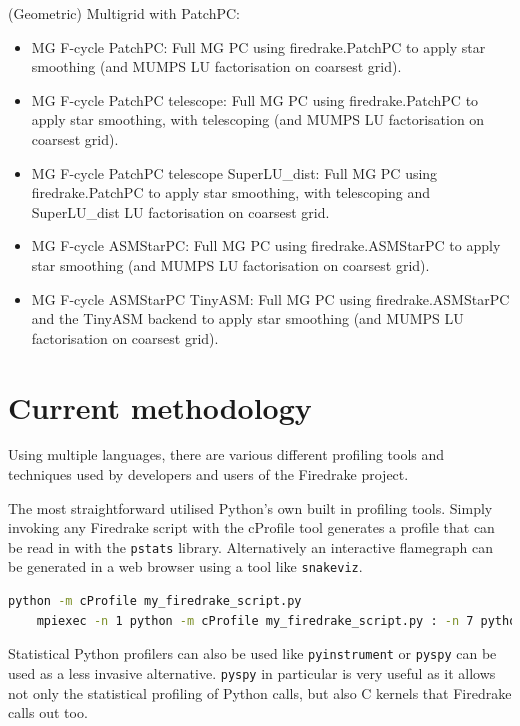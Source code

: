 \documentclass[a4paper,11pt]{article}
\begin{document}
\noindent(Geometric) Multigrid with PatchPC:
\begin{itemize}
	\item MG F-cycle PatchPC: Full MG PC using firedrake.PatchPC to apply star smoothing (and MUMPS LU factorisation on coarsest grid).
    \item MG F-cycle PatchPC telescope: Full MG PC using firedrake.PatchPC to apply star smoothing, with telescoping (and MUMPS LU factorisation on coarsest grid).
    \item MG F-cycle PatchPC telescope SuperLU\_dist: Full MG PC using firedrake.PatchPC to apply star smoothing, with telescoping and SuperLU\_dist LU factorisation on coarsest grid.
    \item MG F-cycle ASMStarPC: Full MG PC using firedrake.ASMStarPC to apply star smoothing (and MUMPS LU factorisation on coarsest grid).
    \item MG F-cycle ASMStarPC TinyASM: Full MG PC using firedrake.ASMStarPC and the TinyASM backend to apply star smoothing (and MUMPS LU factorisation on coarsest grid).
\end{itemize}
    


\section{Current methodology}
\label{sec:current}
Using multiple languages, there are various different profiling tools and techniques used by developers and users of the Firedrake project.

The most straightforward utilised Python's own built in profiling tools.
Simply invoking any Firedrake script with the cProfile tool generates a profile that can be read in with the \verb`pstats` library.
Alternatively an interactive flamegraph can be generated in a web browser using a tool like \verb`snakeviz`.
\begin{lstlisting}[language=bash]
	python -m cProfile my_firedrake_script.py
	mpiexec -n 1 python -m cProfile my_firedrake_script.py : -n 7 python my_firedrake_script.py
\end{lstlisting}

Statistical Python profilers can also be used like \verb`pyinstrument` or \verb`pyspy` can be used as a less invasive alternative.
\verb`pyspy` in particular is very useful as it allows not only the statistical profiling of Python calls, but also C kernels that Firedrake calls out too.
\end{document}
